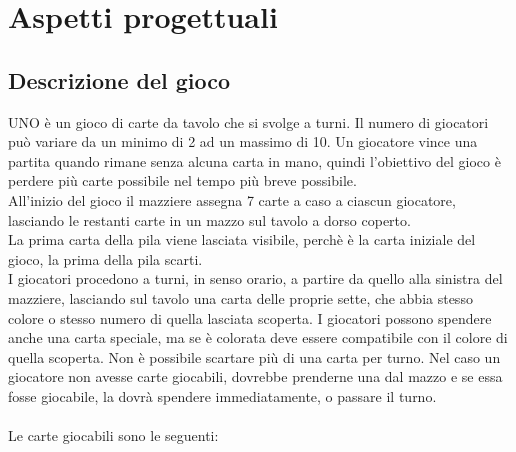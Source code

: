 \documentclass[10pt,a4paper]{article}
\begin{document}
\section{Aspetti progettuali}
\subsection{Descrizione del gioco}
UNO è un gioco di carte da tavolo che si svolge a turni. Il numero di giocatori può variare da un minimo di 2 ad un massimo di 10. Un giocatore vince una partita quando rimane senza alcuna carta in mano, quindi l'obiettivo del gioco è perdere più carte possibile nel tempo più breve possibile.\\All'inizio del gioco il mazziere assegna 7 carte a caso a ciascun giocatore, lasciando le restanti carte in un mazzo sul tavolo a dorso coperto.\\ La prima carta della pila viene lasciata visibile, perchè è la carta iniziale del gioco, la prima della pila scarti.\\ I giocatori procedono a turni, in senso orario, a partire da quello alla sinistra del mazziere, lasciando sul tavolo una carta delle proprie sette, che abbia stesso colore o stesso numero di quella lasciata scoperta. I giocatori possono spendere anche una carta speciale, ma se è colorata deve essere compatibile con il colore di quella scoperta. Non è possibile scartare più di una carta per turno. Nel caso un giocatore non avesse carte giocabili, dovrebbe prenderne una dal mazzo e se essa fosse giocabile, la dovrà spendere immediatamente, o passare il turno.\\\\ Le carte giocabili sono le seguenti:\\
\end{document}
